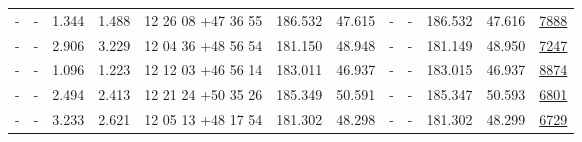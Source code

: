 \documentclass{article}
\begin{document}
\begin{landscape}
\begin{longtable}{c|c|c|c|c|c|c|c|c|c|c|c}
- & - & 1.344 & 1.488 & 12 26 08 +47 36 55 &  186.532 & 47.615 &  - & - & 186.532 & 47.616 & \href{http://banana.transientskp.org/r4/vlo_KmeulenTrap4P23/runningcatalog/7888}{7888}  \\
- & - & 2.906 & 3.229 & 12 04 36 +48 56 54 &  181.150 & 48.948 &  - & - & 181.149 & 48.950 & \href{http://banana.transientskp.org/r4/vlo_KmeulenTrap4P23/runningcatalog/7247}{7247}  \\
- & - & 1.096 & 1.223 & 12 12 03 +46 56 14 &  183.011 & 46.937 &  - & - & 183.015 & 46.937 & \href{http://banana.transientskp.org/r4/vlo_KmeulenTrap4P23/runningcatalog/8874}{8874}  \\
- & - & 2.494 & 2.413 & 12 21 24 +50 35 26 &  185.349 & 50.591 &  - & - & 185.347 & 50.593 & \href{http://banana.transientskp.org/r4/vlo_KmeulenTrap4P23/runningcatalog/6801}{6801}  \\
- & - & 3.233 & 2.621 & 12 05 13 +48 17 54 &  181.302 & 48.298 &  - & - & 181.302 & 48.299 & \href{http://banana.transientskp.org/r4/vlo_KmeulenTrap4P23/runningcatalog/6729}{6729}  \\
\end{longtable}

\end{landscape}
\end{document}
